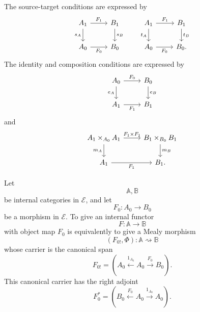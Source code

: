 The source-target conditions are expressed by
\[
\begin{tikzcd}
A_1 \arrow[r, "F_1"] \arrow[d, "s_A"'] & B_1 \arrow[d, "s_B"] \\
A_0 \arrow[r, "F_0"'] & B_0
\end{tikzcd}
\qquad
\begin{tikzcd}
A_1 \arrow[r, "F_1"] \arrow[d, "t_A"'] & B_1 \arrow[d, "t_B"] \\
A_0 \arrow[r, "F_0"'] & B_0.
\end{tikzcd}
\]
The identity and composition conditions are expressed by
\[
\begin{tikzcd}
A_0 \arrow[r, "F_0"] \arrow[d, "e_A"'] & B_0 \arrow[d, "e_B"] \\
A_1 \arrow[r, "F_1"'] & B_1
\end{tikzcd}
\]
and
\[
\begin{tikzcd}
A_1\times_{A_0}A_1
\arrow[r, "F_1\times F_1"]
\arrow[d, "m_A"']
&
B_1\times_{B_0}B_1
\arrow[d, "m_B"]
\\
A_1 \arrow[r, "F_1"'] & B_1.
\end{tikzcd}
\]

\begin{theorem}
\label{thm:left-adjoint-mealy-internal-functor}
Let
\[
\mathbb A,\mathbb B
\]
be internal categories in \(\mathcal E\), and let
\[
F_0:A_0\to B_0
\]
be a morphism in \(\mathcal E\). To give an internal functor
\[
F:\mathbb A\to\mathbb B
\]
with object map \(F_0\) is equivalently to give a Mealy morphism
\[
(F_{0!},\Phi):\mathbb A\rightsquigarrow\mathbb B
\]
whose carrier is the canonical span
\[
F_{0!}
=
\left(
A_0
\xleftarrow{1_{A_0}}
A_0
\xrightarrow{F_0}
B_0
\right).
\]
This canonical carrier has the right adjoint
\[
F_0^\ast
=
\left(
B_0
\xleftarrow{F_0}
A_0
\xrightarrow{1_{A_0}}
A_0
\right).
\]
\end{theorem}

